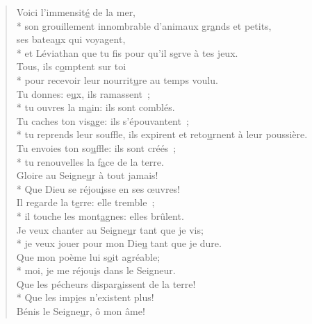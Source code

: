 \begin{verse}
Voici l’immensit\underline{é} de la mer, \\*
son grouillement innombrable d’animaux gr\underline{a}nds et petits, \\
ses batea\underline{u}x qui voyagent, \\*
et Léviathan que tu fis pour qu’il s\underline{e}rve à tes jeux. \\

Tous, ils c\underline{o}mptent sur toi \\*
pour recevoir leur nourrit\underline{u}re au temps voulu. \\
Tu donnes: e\underline{u}x, ils ramassent ; \\*
tu ouvres la m\underline{a}in: ils sont comblés. \\

Tu caches ton vis\underline{a}ge: ils s’épouvantent ; \\*
tu reprends leur souffle, ils expirent
et reto\underline{u}rnent à leur poussière. \\
Tu envoies ton so\underline{u}ffle: ils sont créés ; \\*
tu renouvelles la f\underline{a}ce de la terre. \\

Gloire au Seigne\underline{u}r à tout jamais! \\*
Que Dieu se réjou\underline{i}sse en ses œuvres! \\
Il regarde la t\underline{e}rre: elle tremble ; \\*
il touche les mont\underline{a}gnes: elles brûlent. \\

Je veux chanter au Seigne\underline{u}r tant que je vis; \\*
je veux jouer pour mon Die\underline{u} tant que je dure. \\
Que mon poème lui s\underline{o}it agréable; \\*
moi, je me réjou\underline{i}s dans le Seigneur. \\
Que les pécheurs dispar\underline{a}issent de la terre! \\*
Que les imp\underline{i}es n’existent plus! \\

Bénis le Seigne\underline{u}r, ô mon âme! \\
\end{verse}

